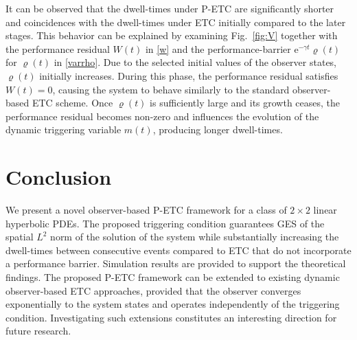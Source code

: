 \documentclass[letterpaper, 10 pt, conference]{ieeeconf}
\begin{document}
It can be observed that the dwell-times under P-ETC are significantly shorter and coincidences with the dwell-times under ETC initially compared to the later stages. This behavior can be explained by examining Fig.~\ref{fig:V} together with the performance residual $W(t)$ in \eqref{w} and the performance-barrier $\mathrm{e}^{-\gamma t}\varrho(t)$ for $\varrho(t)$ in \eqref{varrho}. Due to the selected initial values of the observer states,  $\varrho(t)$ initially increases. During this phase, the performance residual satisfies $W(t)=0$, causing the system to behave similarly to the standard observer-based ETC scheme. Once $\varrho(t)$ is sufficiently large and its growth ceases,  the performance residual becomes non-zero and influences the evolution of the dynamic triggering variable $m(t)$, producing longer dwell-times.
\section{Conclusion}\label{sec:conclusion}
We present a novel observer-based P-ETC framework for a class of $2\times2$ linear hyperbolic PDEs. The proposed triggering condition guarantees GES of the spatial $L^2$ norm of the solution of the system while substantially increasing the dwell-times between consecutive events compared to ETC that do not incorporate a performance barrier. Simulation results are provided to support the theoretical findings.  The proposed P-ETC framework can be extended to existing dynamic observer-based ETC approaches, provided that the observer converges exponentially to the system states and operates independently of the triggering condition. Investigating such extensions constitutes an interesting direction for future research.



\end{document}
